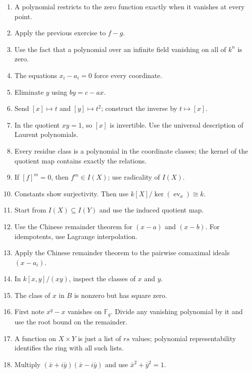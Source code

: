 \begin{enumerate}[label=\textbf{E\arabic*.},leftmargin=*]
\item A polynomial restricts to the zero function exactly when it vanishes at every point.
\item Apply the previous exercise to \(f-g\).
\item Use the fact that a polynomial over an infinite field vanishing on all of \(k^n\) is zero.
\item The equations \(x_i-a_i=0\) force every coordinate.
\item Eliminate \(y\) using \(by=c-ax\).
\item Send \([x]\mapsto t\) and \([y]\mapsto t^2\); construct the inverse by \(t\mapsto[x]\).
\item In the quotient \(xy=1\), so \([x]\) is invertible.  Use the universal description of Laurent polynomials.
\item Every residue class is a polynomial in the coordinate classes; the kernel of the quotient map contains exactly the relations.
\item If \([f]^m=0\), then \(f^m\in I(X)\); use radicality of \(I(X)\).
\item Constants show surjectivity.  Then use \(k[X]/\ker(\operatorname{ev}_a)\cong k\).
\item Start from \(I(X)\subseteq I(Y)\) and use the induced quotient map.
\item Use the Chinese remainder theorem for \((x-a)\) and \((x-b)\).  For idempotents, use Lagrange interpolation.
\item Apply the Chinese remainder theorem to the pairwise comaximal ideals \((x-a_i)\).
\item In \(k[x,y]/(xy)\), inspect the classes of \(x\) and \(y\).
\item The class of \(x\) in \(B\) is nonzero but has square zero.
\item First note \(x^q-x\) vanishes on \(\mathbb F_q\).  Divide any vanishing polynomial by it and use the root bound on the remainder.
\item A function on \(X\times Y\) is just a list of \(rs\) values; polynomial representability identifies the ring with all such lists.
\item Multiply \((\bar x+i\bar y)(\bar x-i\bar y)\) and use \(\bar x^2+\bar y^2=1\).
\end{enumerate}
